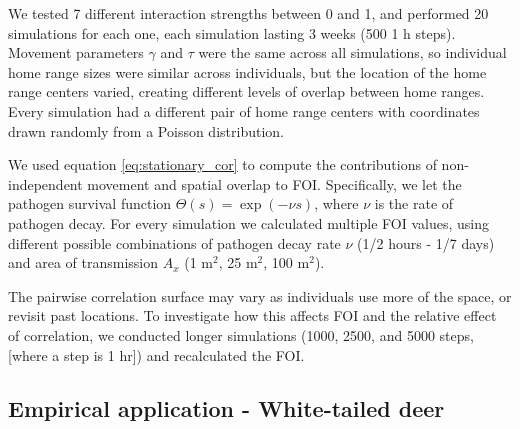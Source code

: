 \documentclass[letterpaper]{article}
\begin{document}
We tested 7 different interaction strengths between 0 and 1, and performed 20 simulations for each one, each simulation lasting 3 weeks (500 1 h steps). Movement parameters $\gamma$ and $\tau$ were the same across all simulations, so individual home range sizes were similar across individuals, but the location of the home range centers varied, creating different levels of overlap between home ranges. Every simulation had a different pair of home range centers with coordinates drawn randomly from a Poisson distribution. %

We used equation \ref{eq:stationary_cor} to compute the contributions of non-independent movement and spatial overlap to FOI.  Specifically, we let the pathogen survival function $\Theta(s) = \exp(-\nu s)$, where $\nu$ is the rate of pathogen decay. For every simulation we calculated multiple FOI values, using different possible combinations of pathogen decay rate $\nu$ (1/2 hours - 1/7 days) and area of transmission $A_x$ (1 m$^2$, 25 m$^2$, 100 m$^2$). %

The pairwise correlation surface may vary as individuals use more of the space, or revisit past locations. To investigate how this affects FOI and the relative effect of correlation, we conducted longer simulations (1000, 2500, and 5000 steps, [where a step is 1 hr]) and recalculated the FOI. 

\subsection*{Empirical application - White-tailed deer}
\end{document}

